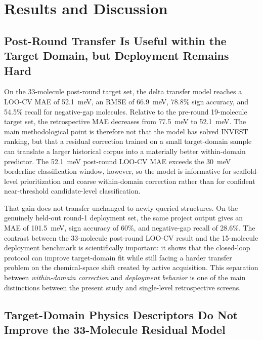 \documentclass[journal=jcisd8,manuscript=article]{achemso}
\begin{document}
\section{Results and Discussion}

\subsection{Post-Round Transfer Is Useful within the Target Domain, but Deployment Remains Hard}

On the 33-molecule post-round target set, the delta transfer model reaches a LOO-CV MAE of \SI{52.1}{meV}, an RMSE of \SI{66.9}{meV}, 78.8\% sign accuracy, and 54.5\% recall for negative-gap molecules. Relative to the pre-round 19-molecule target set, the retrospective MAE decreases from \SI{77.5}{meV} to \SI{52.1}{meV}. The main methodological point is therefore not that the model has solved INVEST ranking, but that a residual correction trained on a small target-domain sample can translate a larger historical corpus into a materially better within-domain predictor. The \SI{52.1}{meV} post-round LOO-CV MAE exceeds the \SI{30}{meV} borderline classification window, however, so the model is informative for scaffold-level prioritization and coarse within-domain correction rather than for confident near-threshold candidate-level classification.

That gain does not transfer unchanged to newly queried structures. On the genuinely held-out round-1 deployment set, the same project output gives an MAE of \SI{101.5}{meV}, sign accuracy of 60\%, and negative-gap recall of 28.6\%. The contrast between the 33-molecule post-round LOO-CV result and the 15-molecule deployment benchmark is scientifically important: it shows that the closed-loop protocol can improve target-domain fit while still facing a harder transfer problem on the chemical-space shift created by active acquisition. This separation between \emph{within-domain correction} and \emph{deployment behavior} is one of the main distinctions between the present study and single-level retrospective screens.

\subsection{Target-Domain Physics Descriptors Do Not Improve the 33-Molecule Residual Model}
\end{document}
